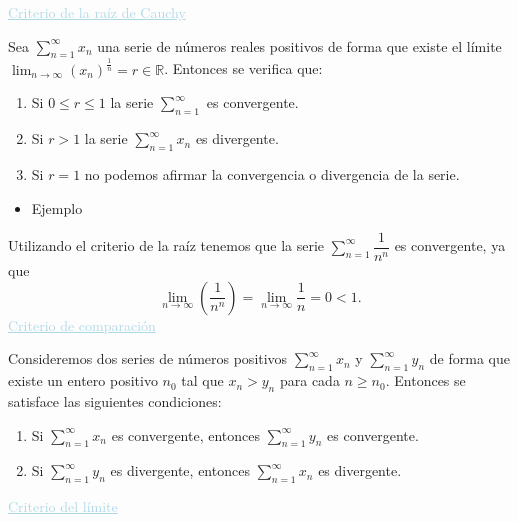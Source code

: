 \documentclass[12pt]{article}
\begin{document}
\textcolor{lightblue}{\underline{Criterio de la raíz de Cauchy}}

Sea $\sum_{n=1}^{\infty}x_n$ una serie de números reales positivos de forma que existe el límite $\lim_{n\to\infty}(x_n)^{\frac{1}{n}}=r\in\mathbb{R}$. Entonces se verifica que:
\begin{enumerate}[label=\arabic*)]
	\item Si $0\le r\le1$ la serie $\sum_{n=1}^{\infty}$ es convergente.
	\item Si $r>1$ la serie $ \sum_{n=1}^{\infty}x_n$ es divergente.
	\item Si $r=1$ no podemos afirmar la convergencia o divergencia de la serie.
\end{enumerate}
\begin{itemize}[label=\color{red}\textbullet, leftmargin=*]
	\item \color{lightblue}Ejemplo
\end{itemize}
Utilizando el criterio de la raíz tenemos que la serie $\sum_{n=1}^{\infty}\dfrac{1}{n^n}$ es convergente, ya que \[ \lim_{n\to\infty}\left(\dfrac{1}{n^n}\right) =\lim_{n\to\infty}\dfrac{1}{n}=0<1.\]
\textcolor{lightblue}{\underline{Criterio de comparación}}

Consideremos dos series de números positivos $\sum_{n=1}^{\infty}x_n$ y $\sum_{n=1}^{\infty}y_n$ de forma que existe un entero positivo $n_0$ tal que $x_n>y_n$ para cada $n \ge n_0$. Entonces se satisface las siguientes condiciones:
\begin{enumerate}[label=\arabic*)]
	\item Si $\sum_{n=1}^{\infty}x_n$ es convergente, entonces $\sum_{n=1}^{\infty}y_n$ es convergente.
	\item Si $\sum_{n=1}^{\infty}y_n$ es divergente, entonces $\sum_{n=1}^{\infty}x_n$ es divergente.
\end{enumerate}
\textcolor{lightblue}{\underline{Criterio del límite}}
\end{document}
